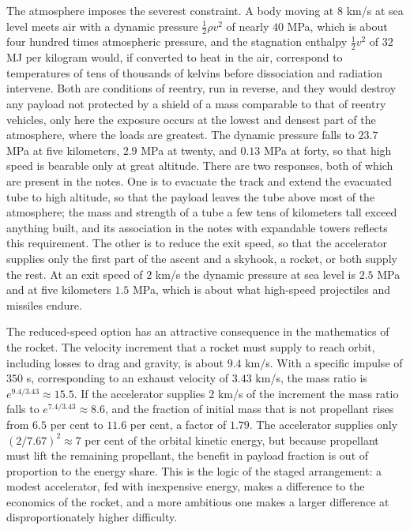 The atmosphere imposes the severest constraint. A body moving at $8$ km/s at sea level meets air with a dynamic pressure $\tfrac12\rho v^2$ of nearly $40$ MPa, which is about four hundred times atmospheric pressure, and the stagnation enthalpy $\tfrac12v^2$ of $32$ MJ per kilogram would, if converted to heat in the air, correspond to temperatures of tens of thousands of kelvins before dissociation and radiation intervene. Both are conditions of reentry, run in reverse, and they would destroy any payload not protected by a shield of a mass comparable to that of reentry vehicles, only here the exposure occurs at the lowest and densest part of the atmosphere, where the loads are greatest. The dynamic pressure falls to $23.7$ MPa at five kilometers, $2.9$ MPa at twenty, and $0.13$ MPa at forty, so that high speed is bearable only at great altitude. There are two responses, both of which are present in the notes. One is to evacuate the track and extend the evacuated tube to high altitude, so that the payload leaves the tube above most of the atmosphere; the mass and strength of a tube a few tens of kilometers tall exceed anything built, and its association in the notes with expandable towers reflects this requirement. The other is to reduce the exit speed, so that the accelerator supplies only the first part of the ascent and a skyhook, a rocket, or both supply the rest. At an exit speed of $2$ km/s the dynamic pressure at sea level is $2.5$ MPa and at five kilometers $1.5$ MPa, which is about what high-speed projectiles and missiles endure.

The reduced-speed option has an attractive consequence in the mathematics of the rocket. The velocity increment that a rocket must supply to reach orbit, including losses to drag and gravity, is about $9.4$ km/s. With a specific impulse of $350$ s, corresponding to an exhaust velocity of $3.43$ km/s, the mass ratio is $e^{9.4/3.43}\approx15.5$. If the accelerator supplies $2$ km/s of the increment the mass ratio falls to $e^{7.4/3.43}\approx8.6$, and the fraction of initial mass that is not propellant rises from $6.5$ per cent to $11.6$ per cent, a factor of $1.79$. The accelerator supplies only $(2/7.67)^2\approx7$ per cent of the orbital kinetic energy, but because propellant must lift the remaining propellant, the benefit in payload fraction is out of proportion to the energy share. This is the logic of the staged arrangement: a modest accelerator, fed with inexpensive energy, makes a difference to the economics of the rocket, and a more ambitious one makes a larger difference at disproportionately higher difficulty.

